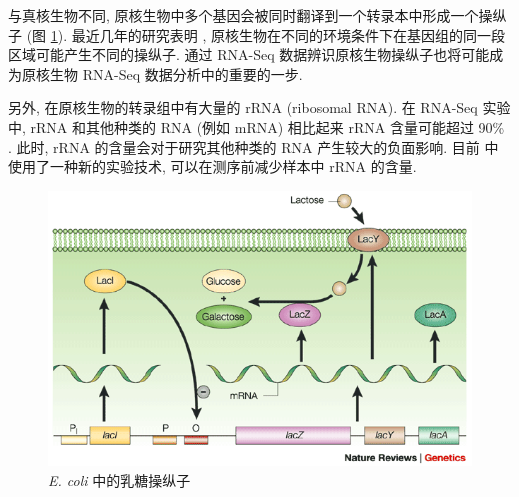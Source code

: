 \nocite{sorek2009prokaryotic}

与真核生物不同, 原核生物中多个基因会被同时翻译到一个转录本中形成一个操纵子 
(图 \ref{e.coli.lactose.operon}). 
最近几年的研究表明 \cite{MarcGuell11272009, koide2009prevalence}, 
原核生物在不同的环境条件下在基因组的同一段区域可能产生不同的操纵子. 
通过 RNA-Seq 数据辨识原核生物操纵子也将可能成为原核生物 RNA-Seq 数据分析中的重要的一步. 

另外, 在原核生物的转录组中有大量的 rRNA (ribosomal RNA).  
在 RNA-Seq 实验中, 
rRNA 和其他种类的 RNA (例如 mRNA) 相比起来 rRNA 含量可能超过 
90\% \cite{giannoukos2012efficient}. 
此时, rRNA 的含量会对于研究其他种类的 RNA 产生较大的负面影响. 
目前  中使用了一种新的实验技术, 
可以在测序前减少样本中 rRNA 的含量. 

\begin{figure}[!t]
\centering
\includegraphics[width=\textwidth]{figures/disc/e-coli-lactose-operon.png}
\caption{\textit{E. coli} 中的乳糖操纵子 \cite{shuman2003art}}
\label{e.coli.lactose.operon}
\end{figure}










